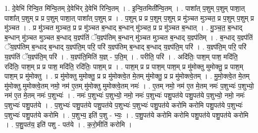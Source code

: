 \documentclass[17pt]{extarticle}
\begin{document}
1. दे॒वेभि॑ रिन्वि॒त मि॑न्वि॒तम् दे॒वेभि॑र् दे॒वेभि॑ रिन्वि॒तम् । . इ॒न्वि॒तमिती᳚न्वि॒तम् । . पाशा᳚त् प॒शुम् प॒शुम् पाशा॒त् पाशा᳚त् प॒शुम् प्र प्र प॒शुम् पाशा॒त् पाशा᳚त् प॒शुम् प्र । . प॒शुम् प्र प्र प॒शुम् प॒शुम् प्र मु॑ञ्चत मुञ्चत॒ प्र प॒शुम् प॒शुम् प्र मु॑ञ्चत । . प्र मु॑ञ्चत मुञ्चत॒ प्र प्र मु॑ञ्चत ब॒न्धाद् ब॒न्धान् मु॑ञ्चत॒ प्र प्र मु॑ञ्चत ब॒न्धात् । . मु॒ञ्च॒त॒ ब॒न्धाद् ब॒न्धान् मु॑ञ्चत मुञ्चत ब॒न्धाद् य॒ज्ञ्प॑तिं ॅय॒ज्ञ्प॑तिम् ब॒न्धान् मु॑ञ्चत मुञ्चत ब॒न्धाद् य॒ज्ञ्प॑तिम् । . ब॒न्धाद् य॒ज्ञ्प॑तिं ॅय॒ज्ञ्प॑तिम् ब॒न्धाद् ब॒न्धाद् य॒ज्ञ्प॑ति॒म् परि॒ परि॑ य॒ज्ञ्प॑तिम् ब॒न्धाद् ब॒न्धाद् य॒ज्ञ्प॑ति॒म् परि॑ । . य॒ज्ञ्प॑ति॒म् परि॒ परि॑ य॒ज्ञ्प॑तिं ॅय॒ज्ञ्प॑ति॒म् परि॑ । . य॒ज्ञ्प॑ति॒मिति॑ य॒ज्ञ् - प॒ति॒म् । . परीति॒ परि॑ । . अदि॑तिः॒ पाश॒म् पाश॒ मदि॑ति॒ रदि॑तिः॒ पाश॒म् प्र प्र पाश॒ मदि॑ति॒ रदि॑तिः॒ पाश॒म् प्र । . पाश॒म् प्र प्र पाश॒म् पाश॒म् प्र मु॑मोक्तु मुमोक्तु॒ प्र पाश॒म् पाश॒म् प्र मु॑मोक्तु । . प्र मु॑मोक्तु मुमोक्तु॒ प्र प्र मु॑मोक्त्वे॒त मे॒तम् मु॑मोक्तु॒ प्र प्र मु॑मोक्त्वे॒तम् । . मु॒मो॒क्त्वे॒त मे॒तम् मु॑मोक्तु मुमोक्त्वे॒तम् नमो॒ नम॑ ए॒तम् मु॑मोक्तु मुमोक्त्वे॒तम् नमः॑ । . ए॒तम् नमो॒ नम॑ ए॒त मे॒तम् नमः॑ प॒शुभ्यः॑ प॒शुभ्यो॒ नम॑ ए॒त मे॒तम् नमः॑ प॒शुभ्यः॑ । . नमः॑ प॒शुभ्यः॑ प॒शुभ्यो॒ नमो॒ नमः॑ प॒शुभ्यः॑ पशु॒पत॑ये पशु॒पत॑ये प॒शुभ्यो॒ नमो॒ नमः॑ प॒शुभ्यः॑ पशु॒पत॑ये । . प॒शुभ्यः॑ पशु॒पत॑ये पशु॒पत॑ये प॒शुभ्यः॑ प॒शुभ्यः॑ पशु॒पत॑ये करोमि करोमि पशु॒पत॑ये प॒शुभ्यः॑ प॒शुभ्यः॑ पशु॒पत॑ये करोमि । . प॒शुभ्य॒ इति॑ प॒शु - भ्यः॒ । . प॒शु॒पत॑ये करोमि करोमि पशु॒पत॑ये पशु॒पत॑ये करोमि । . प॒शु॒पत॑य॒ इति॑ पशु - पत॑ये । . क॒रो॒मीति॑ करोमि । \newline
\end{document}
